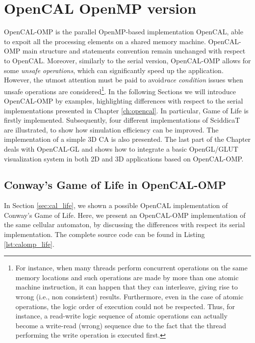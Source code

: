 \chapter{OpenCAL OpenMP version}\label{ch:opencal-omp}

OpenCAL-OMP is the parallel OpenMP-based implementation OpenCAL, able
to expoit all the processing elements on a shared memory
machine. OpenCAL-OMP main structure and statements convention remain
unchanged with respect to OpenCAL. Moreover, similarly to the serial
version, OpenCAL-OMP allows for some \emph{unsafe operations}, which
can significantly speed up the application. However, the utmost
attention must be paid to avoid\textsl{race condition} issues when
unsafe operations are considered\footnote{For instance, when many
  threads perform concurrent operations on the same memory locations
  and such operations are made by more than one atomic machine
  instruction, it can happen that they can interleave, giving rise to
  wrong (i.e., non consistent) results. Furthermore, even in the case
  of atomic operations, the logic order of execution could not be
  respected. Thus, for instance, a read-write logic sequence of atomic
  operations can actually become a write-read (wrong) sequence due to
  the fact that the thread performing the write operation is executed
  first.}. In the following Sections we will introduce OpenCAL-OMP by
examples, highlighting differences with respect to the serial
implementations presented in Chapter \ref{ch:opencal}. In particular,
Game of Life is firstly implemented. Subsequently, four different
implementations of SciddicaT are illustrated, to show how simulation
efficiency can be improved. The implementation of a simple 3D CA is
also presented. The last part of the Chapter deals with OpenCAL-GL and
shows how to integrate a basic OpenGL/GLUT visualization system in
both 2D and 3D applications based on OpenCAL-OMP.


\section{Conway's Game of Life in OpenCAL-OMP}

In Section \ref{sec:cal_life}, we shown a possible OpenCAL
implementation of Conway's Game of Life. Here, we present an
OpenCAL-OMP implementation of the same cellular automaton, by
discussing the differences with respect its serial implementation. The
complete source code can be found in Listing \ref{lst:calomp_life}.



